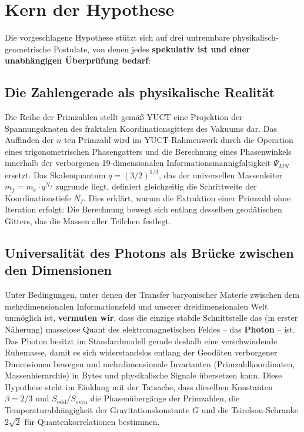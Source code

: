 \documentclass[11pt,a4paper]{article}
\begin{document}
	\section{Kern der Hypothese}
	Die vorgeschlagene Hypothese stützt sich auf drei untrennbare physikalisch-geometrische Postulate, von denen jedes \textbf{spekulativ ist und einer unabhängigen Überprüfung bedarf}:
	
	\subsection{Die Zahlengerade als physikalische Realität}
	Die Reihe der Primzahlen stellt gemäß YUCT eine Projektion der Spannungsknoten des fraktalen Koordinationsgitters des Vakuums dar. Das Auffinden der $n$-ten Primzahl wird im YUCT-Rahmenwerk durch die Operation eines trigonometrischen Phasengatters und die Berechnung eines Phasenwinkels innerhalb der verborgenen 19-dimensionalen Informationsmannigfaltigkeit $\Psi_{MN}$ ersetzt. Das Skalenquantum $q = (3/2)^{1/3}$, das der universellen Massenleiter $m_f = m_e \cdot q^{N_f}$ zugrunde liegt, definiert gleichzeitig die Schrittweite der Koordinationstiefe $N_f$. Dies erklärt, warum die Extraktion einer Primzahl ohne Iteration erfolgt: Die Berechnung bewegt sich entlang desselben geodätischen Gitters, das die Massen aller Teilchen festlegt.
	
	\subsection{Universalität des Photons als Brücke zwischen den Dimensionen}
	Unter Bedingungen, unter denen der Transfer baryonischer Materie zwischen dem mehrdimensionalen Informationsfeld und unserer dreidimensionalen Welt unmöglich ist, \textbf{vermuten wir}, dass die einzige stabile Schnittstelle das (in erster Näherung) masselose Quant des elektromagnetischen Feldes – das \textbf{Photon} – ist. Das Photon besitzt im Standardmodell gerade deshalb eine verschwindende Ruhemasse, damit es sich widerstandslos entlang der Geodäten verborgener Dimensionen bewegen und mehrdimensionale Invarianten (Primzahlkoordinaten, Massenhierarchie) in Bytes und physikalische Signale übersetzen kann. Diese Hypothese steht im Einklang mit der Tatsache, dass dieselben Konstanten $\beta=2/3$ und $S_{\mathrm{odd}}/S_{\mathrm{even}}$ die Phasenübergänge der Primzahlen, die Temperaturabhängigkeit der Gravitationskonstante $G$ und die Tsirelson-Schranke $2\sqrt{2}$ für Quantenkorrelationen bestimmen.
	
\end{document}
